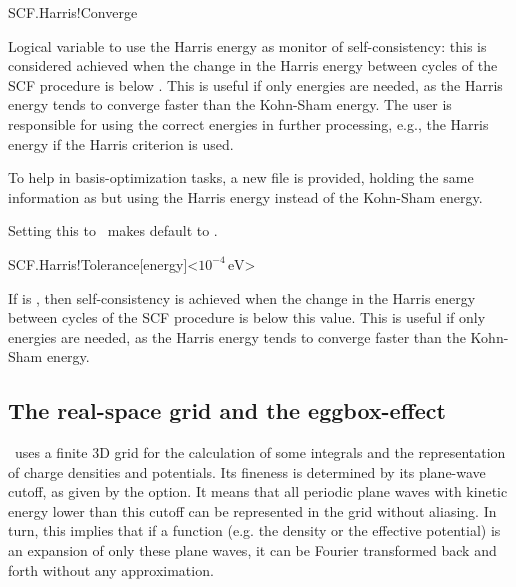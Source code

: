 \begin{fdflogicalF}{SCF.Harris!Converge}

  Logical variable to use the Harris energy as monitor of
  self-consistency: this is considered achieved when the change in the
  Harris energy between cycles of the SCF procedure is below
  . This is useful if only
  energies are needed, as the Harris energy tends to converge faster
  than the Kohn-Sham energy. The user is responsible for using the
  correct energies in further processing, e.g., the Harris energy if
  the Harris criterion is used.

  To help in basis-optimization tasks, a new file
   is provided, holding the same
  information as  but using the Harris energy
  instead of the Kohn-Sham energy.

  \note Setting this to \fdftrue\ makes 
   default to \fdffalse.

\end{fdflogicalF}

\begin{fdfentry}{SCF.Harris!Tolerance}[energy]<$10^{-4}\,\mathrm{eV}$>

  If  is \fdftrue, then self-consistency is
  achieved when the change in the Harris energy between cycles of the
  SCF procedure is below this value. This is useful if only energies
  are needed, as the Harris energy tends to converge faster than the
  Kohn-Sham energy.
  
\end{fdfentry}



\vspace{5pt}
\subsection{The real-space grid and the eggbox-effect}

\siesta\ uses a finite 3D grid for the calculation of some
integrals and the representation of charge densities and potentials.
Its fineness is determined by its plane-wave cutoff, as
given by the  option. It means that all periodic
plane waves with kinetic energy lower than this cutoff 
can be represented in the grid without aliasing. In turn,
this implies that if a function (e.g. the density or the 
effective potential) is an expansion of
only these plane waves, it can be Fourier transformed
back and forth without any approximation.

